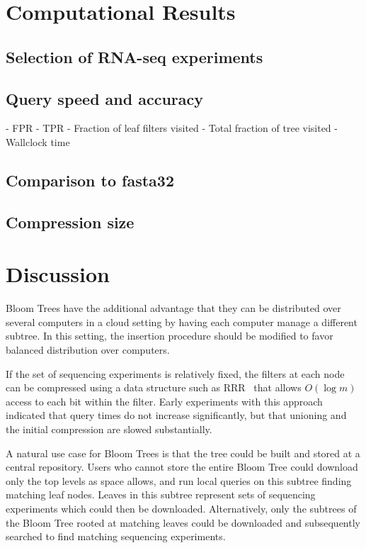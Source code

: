 \documentclass[11pt]{article}
\begin{document}

\section{Computational Results}

\subsection{Selection of RNA-seq experiments}

\subsection{Query speed and accuracy}

- FPR
- TPR
- Fraction of leaf filters visited 
- Total fraction of tree visited
- Wallclock time

\subsection{Comparison to fasta32}

\subsection{Compression size}


\section{Discussion}

Bloom Trees have the additional advantage that they can be distributed over several computers in a cloud setting by having each computer manage a different subtree. In this setting, the insertion procedure should be modified to favor balanced distribution over computers.

If the set of sequencing experiments is relatively fixed, the filters at each node can be compressed using a data structure such as RRR~\cite{rrr} that allows $O(\log m)$ access to each bit within the filter. Early experiments with this approach indicated that query times do not increase significantly, but that unioning and the initial compression are slowed substantially.

A natural use case for Bloom Trees is that the tree could be built and stored at a central repository. Users who cannot store the entire Bloom Tree could download only the top levels as space allows, and run local queries on this subtree finding matching leaf nodes. Leaves in this subtree represent sets of sequencing experiments which could then be downloaded. Alternatively, only the subtrees of the Bloom Tree rooted at matching leaves could be downloaded and subsequently searched to find matching sequencing experiments.
\end{document}

